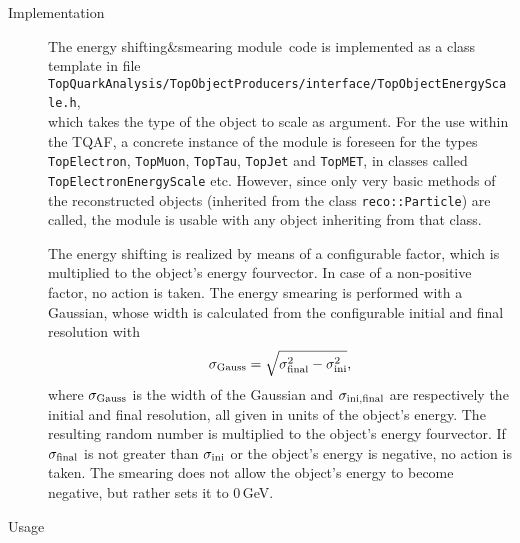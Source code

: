 \documentclass{cmspaper}
\newcommand{\sns}{energy shifting{\&}smearing module}
\begin{document}
    \begin{description}

     \item[Implementation]
     
      The \sns\ code is implemented as a class template in file\\
      {\tt TopQuarkAnalysis/TopObjectProducers/interface/TopObjectEnergyScale.h},\\
      which takes the type of the object to scale as argument.
      For the use within the TQAF, a concrete instance of the module is foreseen for the types {\tt TopElectron}, {\tt TopMuon}, {\tt TopTau}, {\tt TopJet} and {\tt TopMET}, in classes called {\tt TopElectronEnergyScale} etc.
      However, since only very basic methods of the reconstructed objects (inherited from the class {\tt reco::Particle}) are called, the module is usable with any object inheriting from that class.

      The energy shifting is realized by means of a configurable factor, which is multiplied to the object's energy fourvector.
      In case of a non-positive factor, no action is taken.
      The energy smearing is performed with a Gaussian, whose width is calculated from the configurable initial and final resolution with
      \begin{equation}
       \label{EQNSIGMAGAUSS}
       \sigma_{\rm Gauss} = \sqrt{\sigma_{\rm final}^2-\sigma_{\rm ini}^2} \mbox{,}
      \end{equation}
      where $\sigma_{\rm Gauss}$ is the width of the Gaussian and $\sigma_{\rm ini,final}$ are respectively the initial and final resolution, all given in units of the object's energy. The resulting random number is multiplied to the object's energy fourvector. If $\sigma_{\rm final}$ is not greater than $\sigma_{\rm ini}$ or the object's energy is negative, no action is taken. The smearing does not allow the object's energy to become negative, but rather sets it to $0\,$GeV.

     \item[Usage]
     

\end{description}
\end{document}
